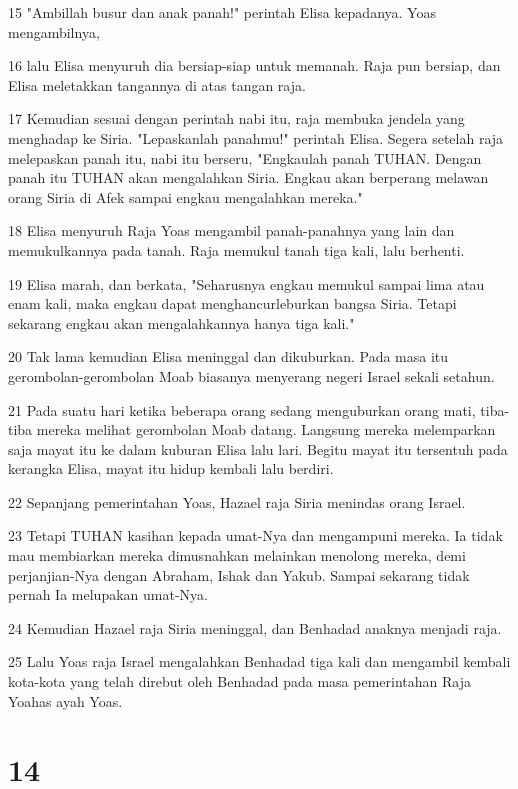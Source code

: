 \par 15 "Ambillah busur dan anak panah!" perintah Elisa kepadanya. Yoas mengambilnya,
\par 16 lalu Elisa menyuruh dia bersiap-siap untuk memanah. Raja pun bersiap, dan Elisa meletakkan tangannya di atas tangan raja.
\par 17 Kemudian sesuai dengan perintah nabi itu, raja membuka jendela yang menghadap ke Siria. "Lepaskanlah panahmu!" perintah Elisa. Segera setelah raja melepaskan panah itu, nabi itu berseru, "Engkaulah panah TUHAN. Dengan panah itu TUHAN akan mengalahkan Siria. Engkau akan berperang melawan orang Siria di Afek sampai engkau mengalahkan mereka."
\par 18 Elisa menyuruh Raja Yoas mengambil panah-panahnya yang lain dan memukulkannya pada tanah. Raja memukul tanah tiga kali, lalu berhenti.
\par 19 Elisa marah, dan berkata, "Seharusnya engkau memukul sampai lima atau enam kali, maka engkau dapat menghancurleburkan bangsa Siria. Tetapi sekarang engkau akan mengalahkannya hanya tiga kali."
\par 20 Tak lama kemudian Elisa meninggal dan dikuburkan. Pada masa itu gerombolan-gerombolan Moab biasanya menyerang negeri Israel sekali setahun.
\par 21 Pada suatu hari ketika beberapa orang sedang menguburkan orang mati, tiba-tiba mereka melihat gerombolan Moab datang. Langsung mereka melemparkan saja mayat itu ke dalam kuburan Elisa lalu lari. Begitu mayat itu tersentuh pada kerangka Elisa, mayat itu hidup kembali lalu berdiri.
\par 22 Sepanjang pemerintahan Yoas, Hazael raja Siria menindas orang Israel.
\par 23 Tetapi TUHAN kasihan kepada umat-Nya dan mengampuni mereka. Ia tidak mau membiarkan mereka dimusnahkan melainkan menolong mereka, demi perjanjian-Nya dengan Abraham, Ishak dan Yakub. Sampai sekarang tidak pernah Ia melupakan umat-Nya.
\par 24 Kemudian Hazael raja Siria meninggal, dan Benhadad anaknya menjadi raja.
\par 25 Lalu Yoas raja Israel mengalahkan Benhadad tiga kali dan mengambil kembali kota-kota yang telah direbut oleh Benhadad pada masa pemerintahan Raja Yoahas ayah Yoas.

\chapter{14}

